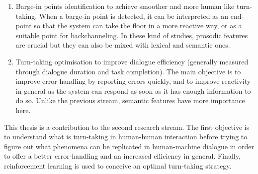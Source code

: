     \begin{enumerate}
    	\item Barge-in points identification to achieve smoother and more human like turn-taking. When a barge-in point is detected, it can be interpreted as an end-point so that the system can take the floor in a more reactive way, or as a suitable point for backchanneling. In these kind of studies, prosodic features are crucial but they can also be mixed with lexical and semantic ones.
        \item Turn-taking optimisation to improve dialogue efficiency (generally measured through dialogue duration and task completion). The main objective is to improve error handling by reporting errors quickly, and to improve reactivity in general as the system can respond as soon as it has enough information to do so. Unlike the previous stream, semantic features have more importance here.
    \end{enumerate}
    
    This thesis is a contribution to the second research stream. The first objective is to understand what is turn-taking in human-human interaction before trying to figure out what phenomena can be replicated in human-machine dialogue in order to offer a better error-handling and an increased efficiency in general. Finally, reinforcement learning is used to conceive an optimal turn-taking strategy.
    
    
    
    
    
    

